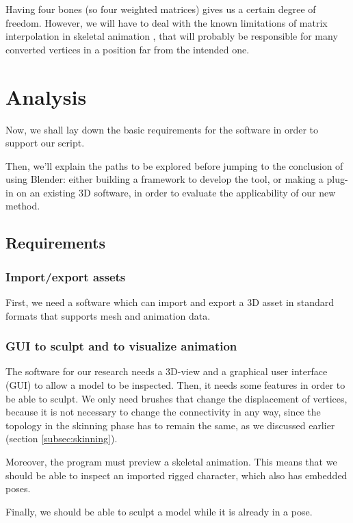 \documentclass[12pt,twoside]{report}
\begin{document}
Having four bones (so four weighted matrices) gives us a certain degree of freedom. However, we will have to deal with the known limitations of matrix interpolation in skeletal animation \cite{lewis2000pose}, that will probably be responsible for many converted vertices in a position far from the intended one.

\chapter{Analysis}

Now, we shall lay down the basic requirements for the software in order to support our script.

Then, we'll explain the paths to be explored before jumping to the conclusion of using Blender: either building a framework to develop the tool, or making a plug-in on an existing 3D software, in order to evaluate the applicability of our new method.

\section{Requirements}
\subsection{Import/export assets}

First, we need a software which can import and export a 3D asset in standard formats that supports mesh and animation data.

\subsection{GUI to sculpt and to visualize animation}
\label{sec:GUI_sclupt_anim_req}
The software for our research needs a 3D-view and a graphical user interface (GUI) to allow a model to be inspected. Then, it needs some features in order to be able to sculpt. We only need brushes that change the displacement of vertices, because it is not necessary to change the connectivity in any way, since the topology in the skinning phase has to remain the same, as we discussed earlier (section \ref{subsec:skinning}).

Moreover, the program must preview a skeletal animation. This means that we should be able to inspect an imported rigged character, which also has embedded poses.

Finally, we should be able to sculpt a model while it is already in a pose.
\end{document}

